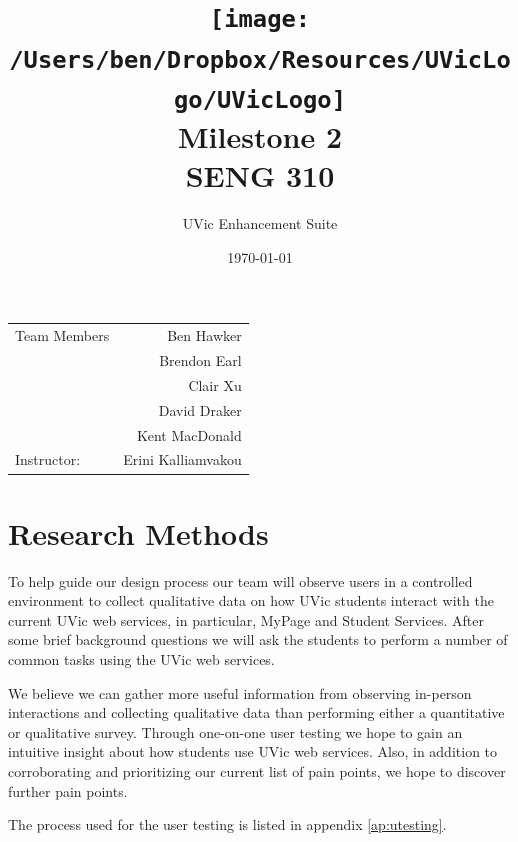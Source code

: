 \documentclass{article}
\title{\texttt{[image: /Users/ben/Dropbox/Resources/UVicLogo/UVicLogo]} \\ \vspace{7mm} Milestone 2 \\ SENG 310} %
\author{UVic Enhancement Suite} %
\date{\today} %
\begin{document}
\maketitle %

\begin{center}
\begin{tabular}{l r}
Team Members & Ben Hawker \\
 & Brendon Earl \\
 & Clair Xu \\
 & David Draker \\
 & Kent MacDonald \\
Instructor: & Erini Kalliamvakou  %
\end{tabular}
\end{center}


\tableofcontents


\section{Research Methods}

To help guide our design process our team will observe users in a controlled environment to collect qualitative data on how UVic students interact with the current UVic web services, in particular, MyPage and Student Services. After some brief background questions we will ask the students to perform a number of common tasks using the UVic web services.

We believe we can gather more useful information from observing in-person interactions and collecting qualitative data than performing either a quantitative or qualitative survey. Through one-on-one user testing we hope to gain an intuitive insight about how students use UVic web services. Also, in addition to corroborating and prioritizing our current list of pain points, we hope to discover further pain points.

The process used for the user testing is listed in appendix \ref{ap:utesting}.


\end{document}
